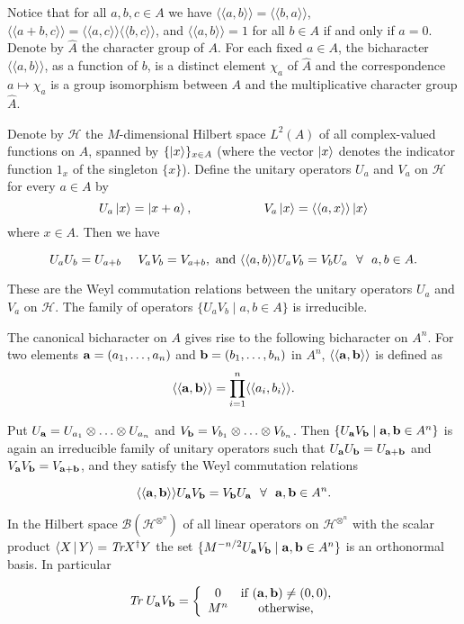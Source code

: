 \documentclass{Rinton-P9x6}
\newcommand {\ket} [1] {\ensuremath \left\vert#1\ensuremath \right\rangle}
\newcommand {\braket} [2]
{\ensuremath \left\langle#1\ensuremath\,{\vert}\,{#2}\ensuremath \right\rangle}
\newcommand{\Tr}{\mbox{\it Tr}}
\renewcommand{\a}{{\bf a}}
\renewcommand{\b}{{\bf b}}
\newcommand{\Hi}{{\ensuremath{\mathcal{H}}}}
\newcommand{\B}{{\ensuremath{\mathcal{B}}}}
\newcommand{\Hin}{{\ensuremath{\mathcal{H}^{\otimes^n}}}}
\newcommand{\biangle}[1]{\langle\langle #1\rangle\rangle}
\begin{document}
Notice that for all $a,b,c\in A$ we have
$\biangle{a,b}=\biangle{b,a}$,
$\biangle{a+b,c}=\biangle{a,c}\biangle{b,c}$, and $\biangle{a,b}=1$
for all $b\in A$ if and only if $a=0$. Denote by $\hat{A}$ the
character group of $A$. For each fixed $a\in A$, the bicharacter
$\biangle{a,b}$, as a function of $b$, is a distinct element $\chi_a$
of $\hat{A}$ and the correspondence $a\mapsto \chi_a$ is a group
isomorphism between $A$ and the multiplicative character group
$\hat{A}$.

Denote by $\Hi$ the $M$-dimensional Hilbert space $L^2(A)$ of all
complex-valued functions on $A$, spanned by $\{\ket{x}\}_{x\in A}$
(where the vector $\ket{x}$ denotes the indicator function $1_x$ of
the singleton $\{x\}$).  Define the unitary operators $U_{a}$ and
$V_{a}$ on $\Hi$ for every $a\in A$ by
\[
U_a\ket{x}=\ket{x+a},\hspace{2cm} V_{a}\ket{x}=\biangle{a,x}\ket{x}
\]
where $x\in A$. Then we have

\[
U_aU_b=U_{a+b}~~~~V_aV_b=V_{a+b},\mbox{ and }\\
\biangle{a,b}U_aV_b=V_bU_a\mbox{~~}\forall\mbox{~~} a, b\in A.
\]

These are the Weyl commutation relations between the unitary operators
$U_{a}$ and $V_{a}$ on $\Hi$. The family of operators $\{U_aV_b\mid a,
b\in A\}$ is irreducible. 

The canonical bicharacter on $A$ gives rise to the following
bicharacter on $A^n$.  For two elements $\a=(a_1,\ldots,a_n)$ and
$\b=(b_1,\ldots,b_n)$ in $A^n$, $\biangle{\a,\b}$ is defined as
\[
\biangle{\a,\b}=\prod_{i=1}^n\biangle{a_i,b_i}.
\]

Put $U_{\a}=U_{a_1}\otimes\ldots\otimes U_{a_n}$ and
$V_{\b}=V_{b_1}\otimes\ldots\otimes V_{b_n}$. Then $\{U_{\a}V_{\b}\mid
\a, \b\in A^n\}$ is again an irreducible family of unitary operators
such that $U_{\a}U_{\b}=U_{\a+\b}$ and $V_{\a}V_{\b}=V_{\a+\b}$, and
they satisfy the Weyl commutation relations

\[
\biangle{\a,\b}U_{\a}V_{\b}=V_{\b}U_{\a}\mbox{~~}\forall\mbox{~~}
\a, \b\in A^n.
\]

In the Hilbert space $\B(\Hin)$ of all linear operators on $\Hin$ with
the scalar product $\braket{X}{Y}=\Tr X^{\dagger}Y$ the set
$\{M^{-n/2}U_{\a}V_{\b}\mid \a, \b\in A^n\}$ is an orthonormal basis.
In particular

\[
\Tr~U_{\a}V_{\b}=
\left\{
\begin{array}{cc}
    0&\textrm{if } (\a,\b) \neq (0,0), \\
    M^n&\textrm{otherwise,}
\end{array}
\right.
\]
\end{document}

